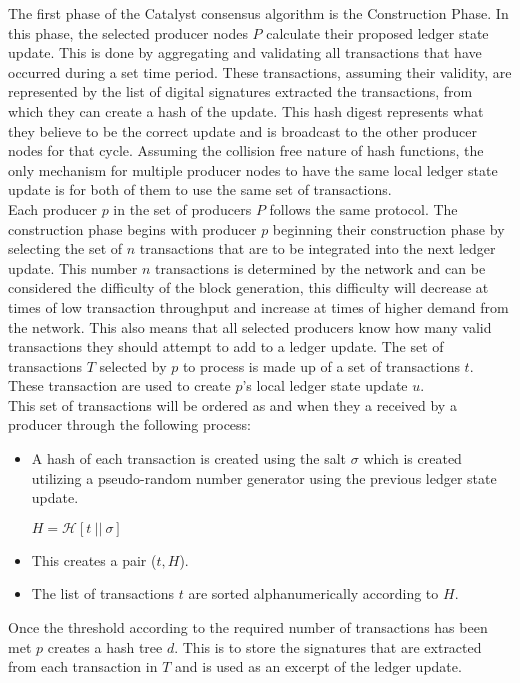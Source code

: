 The first phase of the Catalyst consensus algorithm is the Construction Phase. In this phase, the selected producer nodes $P$ calculate their proposed ledger state update. This is done by aggregating and validating all transactions that have occurred during a set time period. These transactions, assuming their validity, are represented by the list of digital signatures extracted the transactions, from which they can create a hash of the update. This hash digest represents what they believe to be the correct update and is broadcast to the other producer nodes for that cycle. Assuming the collision free nature of hash functions, the only mechanism for multiple producer nodes to have the same local ledger state update is for both of them to use the same set of transactions. \\

Each producer $p$ in the set of producers $P$ follows the same protocol. The construction phase begins with producer $p$ beginning their construction phase by selecting the set of $n$ transactions that are to be integrated into the next ledger update. This number $n$ transactions is determined by the network and can be considered the difficulty of the block generation, this difficulty will decrease at times of low transaction throughput and increase at times of higher demand from the network. This also means that all selected producers know how many valid transactions they should attempt to add to a ledger update. The set of transactions $T$ selected by $p$ to process is made up of a set of transactions $t$. These transaction are used to create $p$'s local ledger state update $u$. \\

This set of transactions will be ordered as and when they a received by a producer through the following process:

\begin{itemize} 
\item A hash of each transaction is created using the salt $\sigma$ which is created utilizing a pseudo-random number generator using the previous ledger state update.
\begin{center}
$H = \mathcal{H}[t~||~\sigma]$
\end{center}
\item This creates a pair ($t,H$).
\item The list of transactions $t$ are sorted alphanumerically according to $H$.
\end{itemize}

Once the threshold according to the required number of transactions has been met $p$ creates a hash tree $d$. This is to store the signatures that are extracted from each transaction in $T$ and is used as an excerpt of the ledger update. 

